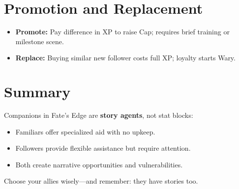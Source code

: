\section{Promotion and Replacement}

\begin{itemize}
  \item \textbf{Promote:} Pay difference in XP to raise Cap; requires brief training or milestone scene.
  \item \textbf{Replace:} Buying similar new follower costs full XP; loyalty starts Wary.
\end{itemize}

\section{Summary}

Companions in Fate’s Edge are \textbf{story agents}, not stat blocks:

\begin{itemize}
  \item Familiars offer specialized aid with no upkeep.
  \item Followers provide flexible assistance but require attention.
  \item Both create narrative opportunities and vulnerabilities.
\end{itemize}

Choose your allies wisely—and remember: they have stories too.

